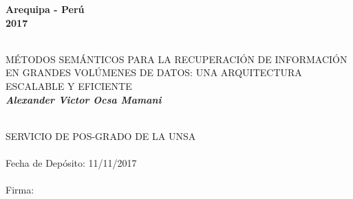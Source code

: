 \begin{titlepage}
\begin{center}
\begin{flushright}
\end{flushright}

\vspace*{2.5cm}
\begin{center}
\small
\textbf{Arequipa - Perú \\2017}
\end{center}
\cleardoublepage


\newpage





\vfill

\vspace*{5cm}

\begin{center}
\begin{minipage}[c]{12cm}
\begin{center}
\hrulefill\\
\vspace{.5cm} {\large MÉTODOS SEMÁNTICOS PARA LA RECUPERACIÓN DE INFORMACIÓN EN GRANDES VOLÚMENES DE DATOS: UNA ARQUITECTURA ESCALABLE Y EFICIENTE}\\
\vspace{1.3cm}
\small\textbf{\it Alexander Victor Ocsa Mamani}\\
\vspace{.5cm}
\hrulefill\\
\end{center}
\end{minipage}
\end{center}

\vfill





\vspace*{10cm}
\begin{flushright}
\begin{Sbox}
\begin{minipage}{8.5cm}
\footnotesize
SERVICIO DE  POS-GRADO DE LA UNSA\\
\\
Fecha de Depósito:    11/11/2017\\
\\
Firma:\hrulefill
\end{minipage}
\end{Sbox}
\fbox{\TheSbox}
\end{flushright}






\end{center}
\end{titlepage}
